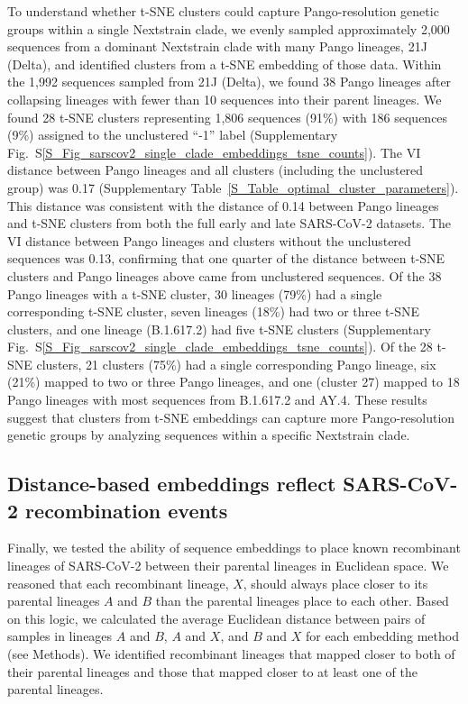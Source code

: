\documentclass[webpdf,contemporary,large,single]{oup-authoring-template}%
\theoremstyle{thmstyleone}%
\theoremstyle{thmstyletwo}%
\theoremstyle{thmstylethree}%
\begin{document}
To understand whether t-SNE clusters could capture Pango-resolution genetic groups within a single Nextstrain clade, we evenly sampled approximately 2,000 sequences from a dominant Nextstrain clade with many Pango lineages, 21J (Delta), and identified clusters from a t-SNE embedding of those data.
Within the 1,992 sequences sampled from 21J (Delta), we found 38 Pango lineages after collapsing lineages with fewer than 10 sequences into their parent lineages.
We found 28 t-SNE clusters representing 1,806 sequences (91\%) with 186 sequences (9\%) assigned to the unclustered ``-1'' label (Supplementary Fig.~S\ref{S_Fig_sarscov2_single_clade_embeddings_tsne_counts}).
The VI distance between Pango lineages and all clusters (including the unclustered group) was 0.17 (Supplementary Table~\ref{S_Table_optimal_cluster_parameters}).
This distance was consistent with the distance of 0.14 between Pango lineages and t-SNE clusters from both the full early and late SARS-CoV-2 datasets.
The VI distance between Pango lineages and clusters without the unclustered sequences was 0.13, confirming that one quarter of the distance between t-SNE clusters and Pango lineages above came from unclustered sequences.
Of the 38 Pango lineages with a t-SNE cluster, 30 lineages (79\%) had a single corresponding t-SNE cluster, seven lineages (18\%) had two or three t-SNE clusters, and one lineage (B.1.617.2) had five t-SNE clusters (Supplementary Fig.~S\ref{S_Fig_sarscov2_single_clade_embeddings_tsne_counts}).
Of the 28 t-SNE clusters, 21 clusters (75\%) had a single corresponding Pango lineage, six (21\%) mapped to two or three Pango lineages, and one (cluster 27) mapped to 18 Pango lineages with most sequences from B.1.617.2 and AY.4.
These results suggest that clusters from t-SNE embeddings can capture more Pango-resolution genetic groups by analyzing sequences within a specific Nextstrain clade.

\subsection{Distance-based embeddings reflect SARS-CoV-2 recombination events}

Finally, we tested the ability of sequence embeddings to place known recombinant lineages of SARS-CoV-2 between their parental lineages in Euclidean space.
We reasoned that each recombinant lineage, $X$, should always place closer to its parental lineages $A$ and $B$ than the parental lineages place to each other.
Based on this logic, we calculated the average Euclidean distance between pairs of samples in lineages $A$ and $B$, $A$ and $X$, and $B$ and $X$ for each embedding method (see Methods).
We identified recombinant lineages that mapped closer to both of their parental lineages and those that mapped closer to at least one of the parental lineages.
\end{document}
